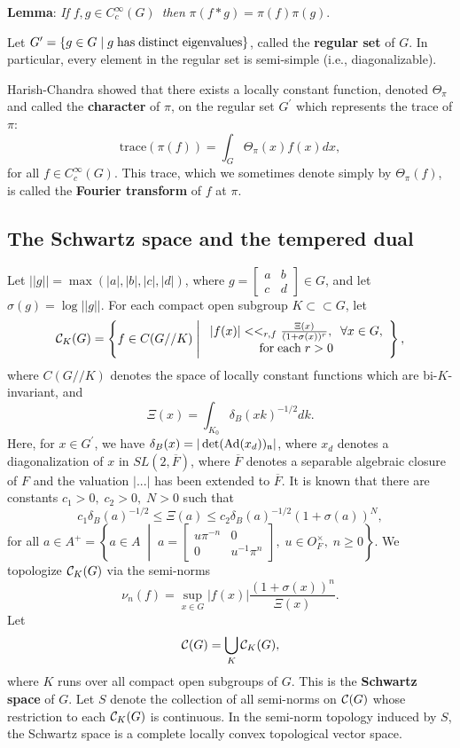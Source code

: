 \documentclass[11pt, a4paper]{article}
\begin{document}
{\bf Lemma}: {\em If }$f,g\in C_c^\infty (G)${\em \ then }$\pi (f*g)=\pi
(f)\pi (g)$.

Let $G^{\prime }=\{g\in G\;|\;g\;{\rm has\;distinct\;eigenvalues}\}$, called
the {\bf regular set} of $G$. In particular, every element in the regular
set is semi-simple (i.e., diagonalizable).

Harish-Chandra showed that there exists a locally constant function, denoted 
$\Theta _\pi $ and called the {\bf character} of $\pi $, on the regular set $%
G^{\prime }$ which represents the trace of $\pi $:
\[
\mathrm{trace}(\pi (f))=\int_G\Theta _\pi (x)f(x)dx,
\]
for all $f\in C_c^\infty (G)$. This trace, which we sometimes denote simply
by $\Theta _\pi (f)$, is called the {\bf Fourier transform} of $f$ at $\pi $.

\subsection{The Schwartz space and the tempered dual}

Let $||g||=\max (|a|,|b|,|c|,|d|)$, where $g=\left[ 
\begin{array}{cc}
a & b \\ 
c & d
\end{array}
\right] \in G$, and let $\sigma (g)=\log ||g||$. For each compact open
subgroup $K\subset \subset G$, let
\[
{\cal C}_K(G)=\left\{f\in C(G//K)\;\middle|\; 
\begin{array}{c}
|f(x)|<<_{r,f}\frac{\Xi (x)}{(1+\sigma (x))^r},\;\;\forall x\in G, \\ 
{\rm for\;each}\;r>0
\end{array}
\right\},
\]
where $C(G//K)$ denotes the space of locally constant functions which
are bi-$K$-invariant, and
\[
\Xi (x)=\int_{K_0}\delta _B(xk)^{-1/2}dk.
\]
Here, for $x\in G^{\prime }$, we have $\delta _B(x)=|\det (\mathrm{Ad}(x_d))_{{\frak n%
}}|$, where $x_d$ denotes a diagonalization of $x$ in $SL(2,\overline{F})$,
where $\overline{F}$ denotes a separable algebraic closure of $F$ and the
valuation $|...|$ has been extended to $\overline{F}$. It is known that there
are constants $c_1>0,\;c_2>0,\;N>0$ such that
\[
c_1\delta _B(a)^{-1/2}\leq \Xi (a)\leq c_2\delta _B(a)^{-1/2}(1+\sigma (a))^N,
\]
for all $a\in A^{+}=\left\{a\in A\;\middle|\;a=\left[ 
\begin{array}{cc}
u\pi ^{-n} & 0 \\ 
0 & u^{-1}\pi ^{n}
\end{array}
\right] ,\;u\in O_F^{\times },\;n\geq 0\right\}$. We topologize ${\cal C}_K(G)$
via the semi-norms
\[
\nu _n(f)=\sup_{x\in G}|f(x)|\frac{(1+\sigma (x))^n}{\Xi (x)}.
\]
Let
\[
{\cal C}(G)=\bigcup_K{\cal C}_K(G),
\]
where $K$ runs over all compact open subgroups of $G$. This is the {\bf %
Schwartz space} of $G$. Let $S$ denote the collection of all semi-norms on $%
{\cal C}(G)$ whose restriction to each ${\cal C}_K(G)$ is continuous. In the
semi-norm topology induced by $S$, the Schwartz space is a complete locally
convex topological vector space.
\end{document}
